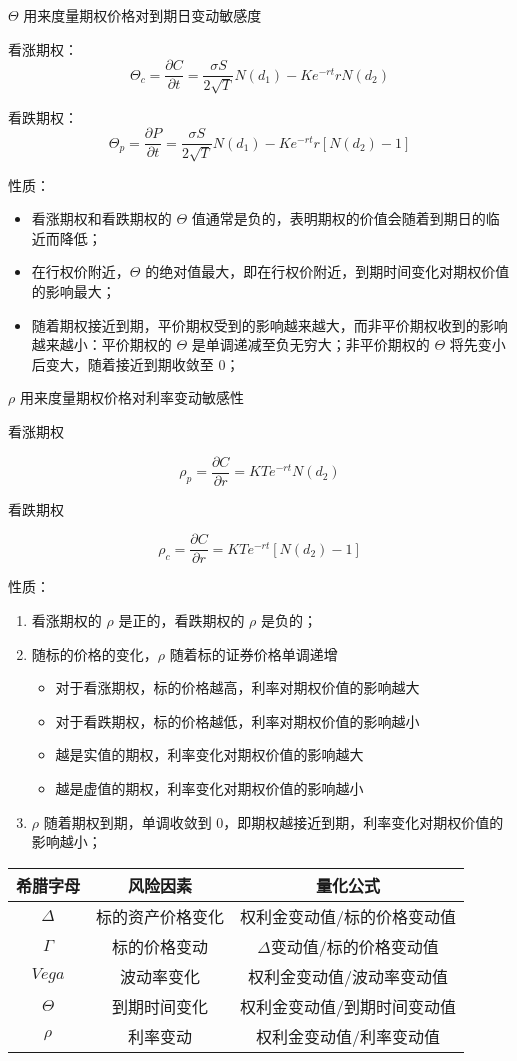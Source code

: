 \documentclass{article}
\begin{document}
$\Theta$ 用来度量期权价格对到期日变动敏感度

看涨期权：
$$\Theta_c=\frac{\partial C}{\partial t}=\frac{\sigma S}{2\sqrt{T}}N(d_1)-Ke^{-rt}rN(d_2)$$

看跌期权：
$$\Theta_p=\frac{\partial P}{\partial t}=\frac{\sigma S}{2\sqrt{T}}N(d_1)-Ke^{-rt}r[N(d_2)-1]$$

性质：
\begin{itemize}
    \item 看涨期权和看跌期权的 $\Theta$ 值通常是负的，表明期权的价值会随着到期日的临近而降低；
    \item 在行权价附近，$\Theta$ 的绝对值最大，即在行权价附近，到期时间变化对期权价值的影响最大；
    \item 随着期权接近到期，平价期权受到的影响越来越大，而非平价期权收到的影响越来越小：平价期权的 $\Theta$ 是单调递减至负无穷大；非平价期权的 $\Theta$ 将先变小后变大，随着接近到期收敛至 0；
\end{itemize}

$\rho$ 用来度量期权价格对利率变动敏感性

看涨期权

$$\rho_p=\frac{\partial C}{\partial r}=KTe^{-rt}N(d_2)$$

看跌期权

$$\rho_c=\frac{\partial C}{\partial r}=KTe^{-rt}[N(d_2)-1]$$

性质：
\begin{enumerate}
    \item 看涨期权的 $\rho$ 是正的，看跌期权的 $\rho$ 是负的；
    \item 随标的价格的变化，$\rho$ 随着标的证券价格单调递增
    \begin{itemize}
        \item 对于看涨期权，标的价格越高，利率对期权价值的影响越大
        \item 对于看跌期权，标的价格越低，利率对期权价值的影响越小
        \item 越是实值的期权，利率变化对期权价值的影响越大
        \item 越是虚值的期权，利率变化对期权价值的影响越小
    \end{itemize}
    \item $\rho$ 随着期权到期，单调收敛到 0，即期权越接近到期，利率变化对期权价值的影响越小；
\end{enumerate}

\begin{table}
    \begin{tabular}{ccc}
        \hline
        希腊字母&风险因素&量化公式\\
        \hline
        $\Delta$&标的资产价格变化&权利金变动值/标的价格变动值\\
        $\Gamma$&标的价格变动&$\Delta$变动值/标的价格变动值\\
        $Vega$&波动率变化&权利金变动值/波动率变动值\\
        $\Theta$&到期时间变化&权利金变动值/到期时间变动值\\
        $\rho$&利率变动&权利金变动值/利率变动值\\
        \hline
    \end{tabular}
\end{table}
\end{document}
